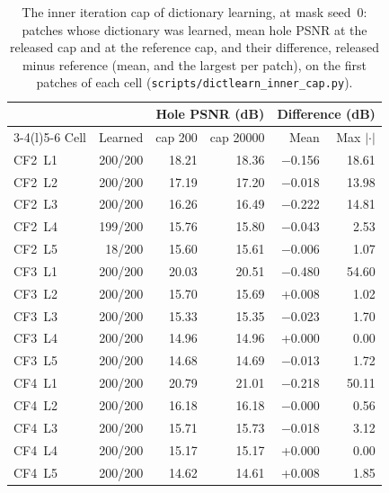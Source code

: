 \documentclass[11pt]{article}
\begin{document}
\begin{table}[htbp]
\centering
\caption{The inner iteration cap of dictionary learning, at mask seed~0: patches whose dictionary was learned, mean hole PSNR at the released cap and at the reference cap, and their difference, released minus reference (mean, and the largest per patch), on the first patches of each cell (\texttt{scripts/dictlearn\_inner\_cap.py}).}
\label{tab:supp:dictcap}
\footnotesize
\begin{tabular}{@{}l r r r r r@{}}
\toprule
 & & \multicolumn{2}{c}{Hole PSNR (dB)} & \multicolumn{2}{c}{Difference (dB)} \\
\cmidrule(lr){3-4}\cmidrule(l){5-6}
Cell & Learned & cap 200 & cap 20000 & Mean & Max $|\cdot|$ \\
\midrule
CF2~L1 & 200/200 & 18.21 & 18.36 & $-$0.156 & 18.61 \\
CF2~L2 & 200/200 & 17.19 & 17.20 & $-$0.018 & 13.98 \\
CF2~L3 & 200/200 & 16.26 & 16.49 & $-$0.222 & 14.81 \\
CF2~L4 & 199/200 & 15.76 & 15.80 & $-$0.043 & 2.53 \\
CF2~L5 & 18/200 & 15.60 & 15.61 & $-$0.006 & 1.07 \\
\midrule
CF3~L1 & 200/200 & 20.03 & 20.51 & $-$0.480 & 54.60 \\
CF3~L2 & 200/200 & 15.70 & 15.69 & +0.008 & 1.02 \\
CF3~L3 & 200/200 & 15.33 & 15.35 & $-$0.023 & 1.70 \\
CF3~L4 & 200/200 & 14.96 & 14.96 & +0.000 & 0.00 \\
CF3~L5 & 200/200 & 14.68 & 14.69 & $-$0.013 & 1.72 \\
\midrule
CF4~L1 & 200/200 & 20.79 & 21.01 & $-$0.218 & 50.11 \\
CF4~L2 & 200/200 & 16.18 & 16.18 & $-$0.000 & 0.56 \\
CF4~L3 & 200/200 & 15.71 & 15.73 & $-$0.018 & 3.12 \\
CF4~L4 & 200/200 & 15.17 & 15.17 & +0.000 & 0.00 \\
CF4~L5 & 200/200 & 14.62 & 14.61 & +0.008 & 1.85 \\
\bottomrule
\end{tabular}
\end{table}
\end{document}

